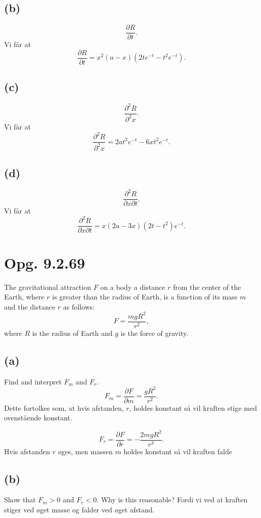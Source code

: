 \documentclass[12pt]{article}
\theoremstyle{definition}
\begin{document}
\subsection*{(b)}
\[ 
\frac{\partial R}{\partial t}
.\]
\bigbreak
Vi får at
\[ 
\frac{\partial R}{\partial t} = x^2(a-x)(2te^{-t}-t^2e^{-t})
.\]


\subsection*{(c)}
\[ 
\frac{\partial^2 R}{\partial^2 x}
.\]
\bigbreak
Vi får at
\[ 
\frac{\partial^2 R}{\partial^2 x} = 2at^2e^{-t} - 6xt^2e^{-t}
.\]


\subsection*{(d)}
\[ 
\frac{\partial^2 R}{\partial x \partial t}
.\]
\bigbreak
Vi får at
\[ 
\frac{\partial^2 R}{\partial x \partial t} = x(2a-3x)(2t-t^2)e^{-t}
.\]

\section*{Opg. 9.2.69}
The gravitational attraction $F$ on a body a distance $r$ from the center of the Earth, where $r$ is greater than the radius of Earth, is a function of its mass $m$ and the distance $r$ as follows:
\[ 
F = \frac{mgR^2}{r^2}
,\]
where $R$ is the radius of Earth and $g$ is the force of gravity.

\subsection*{(a)}
Find and interpret $F_m$ and $F_r$.
\bigbreak
\[ 
F_m = \frac{\partial F}{\partial m} = \frac{gR^2}{r^2}
.\]
Dette fortolkes som, at hvis afstanden, $r$, holdes konstant så vil kraften stige med ovenstående konstant.

\[ 
F_r = \frac{\partial F}{\partial r} = -\frac{2mgR^2}{r^3}
.\]
Hvis afstanden $r$ øges, men massen $m$ holdes konstant så vil kraften falde


\subsection*{(b)}
Show that $F_m>0$ and $F_r<0$. Why is this reasonable?
\bigbreak
Fordi vi ved at kraften stiger ved øget masse og falder ved øget afstand.
\end{document}
